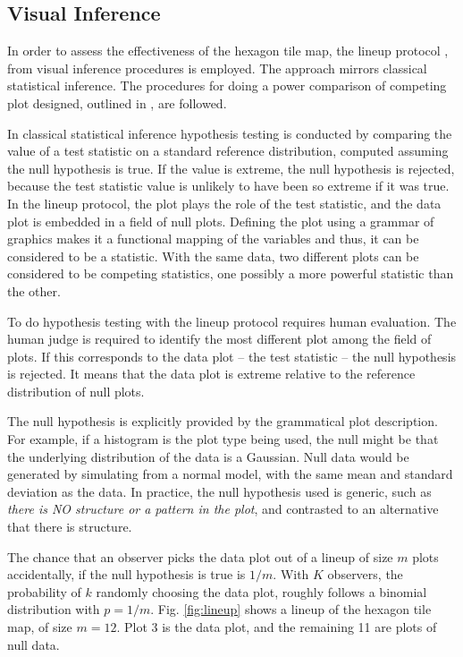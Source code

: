 \documentclass{monashthesis}
\begin{document}
\hypertarget{visual-inference}{%
\subsection{Visual Inference}\label{visual-inference}}

In order to assess the effectiveness of the hexagon tile map, the lineup protocol \autocite{GIIV},\autocite{BCHLLSW09} from visual inference procedures is employed. The approach mirrors classical statistical inference. The procedures for doing a power comparison of competing plot designed, outlined in \textcite{GTPCCD}, are followed.

In classical statistical inference hypothesis testing is conducted by comparing the value of a test statistic on a standard reference distribution, computed assuming the null hypothesis is true. If the value is extreme, the null hypothesis is rejected, because the test statistic value is unlikely to have been so extreme if it was true. In the lineup protocol, the plot plays the role of the test statistic, and the data plot is embedded in a field of null plots. Defining the plot using a grammar of graphics \autocite{ggplot2} makes it a functional mapping of the variables and thus, it can be considered to be a statistic. With the same data, two different plots can be considered to be competing statistics, one possibly a more powerful statistic than the other.

To do hypothesis testing with the lineup protocol requires human evaluation. The human judge is required to identify the most different plot among the field of plots. If this corresponds to the data plot -- the test statistic -- the null hypothesis is rejected. It means that the data plot is extreme relative to the reference distribution of null plots.

The null hypothesis is explicitly provided by the grammatical plot description. For example, if a histogram is the plot type being used, the null might be that the underlying distribution of the data is a Gaussian. Null data would be generated by simulating from a normal model, with the same mean and standard deviation as the data. In practice, the null hypothesis used is generic, such as \emph{there is NO structure or a pattern in the plot}, and contrasted to an alternative that there is structure.

The chance that an observer picks the data plot out of a lineup of size \(m\) plots accidentally, if the null hypothesis is true is \(1/m\). With \(K\) observers, the probability of \(k\) randomly choosing the data plot, roughly follows a binomial distribution with \(p=1/m\). Fig. \ref{fig:lineup} shows a lineup of the hexagon tile map, of size \(m=12\). Plot 3 is the data plot, and the remaining 11 are plots of null data.
\end{document}
